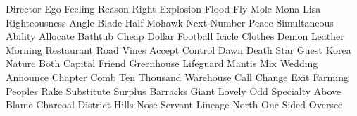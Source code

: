 \documentclass[letterpaper,frontgrid]{flacards}
\begin{document}
        {Director}
        {Ego}
        {Feeling}
        {Reason}
        {Right}
        {Explosion}
        {Flood}
        {Fly}
        {Mole}
        {Mona Lisa}
        {Righteousness}
        {Angle}
        {Blade}
        {Half}
        {Mohawk}
        {Next}
        {Number}
        {Peace}
        {Simultaneous}
        {Ability}
        {Allocate}
        {Bathtub}
        {Cheap}
        {Dollar}
        {Football}
        {Icicle}
        {Clothes}
        {Demon}
        {Leather}
        {Morning}
        {Restaurant}
        {Road}
        {Vines}
        {Accept}
        {Control}
        {Dawn}
        {Death Star}
        {Guest}
        {Korea}
        {Nature}
        {Both}
        {Capital}
        {Friend}
        {Greenhouse}
        {Lifeguard}
        {Mantis}
        {Mix}
        {Wedding}
        {Announce}
        {Chapter}
        {Comb}
        {Ten Thousand}
        {Warehouse}
        {Call}
        {Change}
        {Exit}
        {Farming}
        {Peoples}
        {Rake}
        {Substitute}
        {Surplus}
        {Barracks}
        {Giant}
        {Lovely}
        {Odd}
        {Specialty}
        {Above}
        {Blame}
        {Charcoal}
        {District}
        {Hills}
        {Nose}
        {Servant}
        {Lineage}
        {North}
        {One Sided}
        {Oversee}
\end{document}
